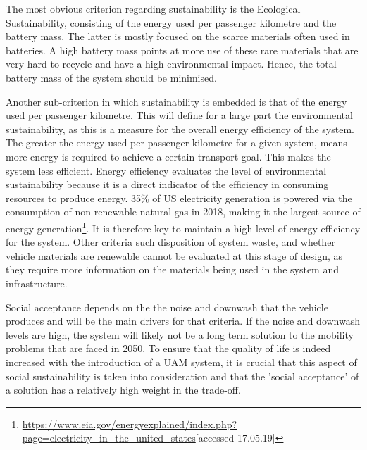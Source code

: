 The most obvious criterion regarding sustainability is the Ecological Sustainability, consisting of the energy used per passenger kilometre and the battery mass. The latter is mostly focused on the scarce materials often used in batteries. A high battery mass points at more use of these rare materials that are very hard to recycle and have a high environmental impact. Hence, the total battery mass of the system should be minimised.

Another sub-criterion in which sustainability is embedded is that of the energy used per passenger kilometre. This will define for a large part the environmental sustainability, as this is a measure for the overall energy efficiency of the system. The greater the energy used per passenger kilometre for a given system, means more energy is required to achieve a certain transport goal. This makes the system less efficient. Energy efficiency evaluates the level of environmental sustainability because it is a direct indicator of the efficiency in consuming resources to produce energy. 35\% of US electricity generation is powered via the consumption of non-renewable natural gas in 2018, making it the largest source of energy generation\footnote{\url{https://www.eia.gov/energyexplained/index.php?page=electricity_in_the_united_states}[accessed 17.05.19]}. It is therefore key to maintain a high level of energy efficiency for the system. Other criteria such disposition of system waste, and whether vehicle materials are renewable cannot be evaluated at this stage of design, as they require more information on the materials being used in the system and infrastructure. 

Social acceptance depends on the the noise and downwash that the vehicle produces and will be the main drivers for that criteria. If the noise and downwash levels are high, the system will likely not be a long term solution to the mobility problems that are faced in 2050. To ensure that the quality of life is indeed increased with the introduction of a UAM system, it is crucial that this aspect of social sustainability is taken into consideration and that the 'social acceptance' of a solution has a relatively high weight in the trade-off. 


